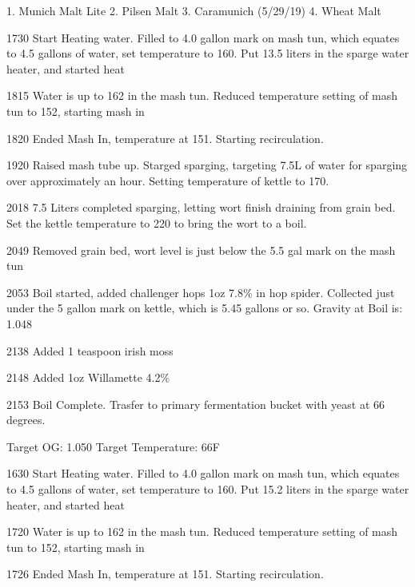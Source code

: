 \def\todaysdate{20190710}
\newday{\todaysdate}\label{\todaysdate}

\FloatBarrier{}
1. Munich Malt Lite
2. Pilsen Malt
3. Caramunich (5/29/19)
4. Wheat Malt

\FloatBarrier{}
1730 Start Heating water.  Filled to 4.0 gallon mark on mash tun, which equates to 4.5 gallons of water, set temperature to 160.  Put 13.5 liters in the sparge water heater, and started heat

1815 Water is up to 162 in the mash tun. Reduced temperature setting of mash tun to 152, starting mash in

1820 Ended Mash In, temperature at 151.  Starting recirculation.

1920 Raised mash tube up. Starged sparging, targeting 7.5L of water for sparging over approximately an hour.  Setting temperature of kettle to 170.

2018 7.5 Liters completed sparging, letting wort finish draining from grain bed.  Set the kettle temperature to 220 to bring the wort to a boil.

2049 Removed grain bed, wort level is just below the 5.5 gal mark on the mash tun

2053 Boil started, added challenger hops 1oz 7.8\% in hop spider.  Collected just under the 5 gallon mark on kettle, which is 5.45 gallons or so.  Gravity at Boil is: 1.048

2138 Added 1 teaspoon irish moss

2148 Added 1oz Willamette 4.2\%

2153 Boil Complete.  Trasfer to primary fermentation bucket with yeast at 66 degrees.

Target OG: 1.050
Target Temperature: 66F

\def\todaysdate{20190807}
\newday{\todaysdate}\label{\todaysdate}

\FloatBarrier{}
1630 Start Heating water.  Filled to 4.0 gallon mark on mash tun, which equates to 4.5 gallons of water, set temperature to 160.  Put 15.2 liters in the sparge water heater, and started heat

1720 Water is up to 162 in the mash tun. Reduced temperature setting of mash tun to 152, starting mash in

1726 Ended Mash In, temperature at 151.  Starting recirculation.


